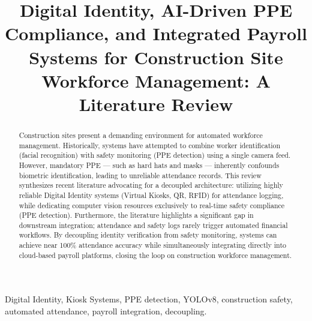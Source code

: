 \documentclass[conference]{IEEEtran}
\begin{document}
\title{Digital Identity, AI-Driven PPE Compliance, and Integrated Payroll Systems for Construction Site Workforce Management: A Literature Review\\}

\author{
\and
{}
}

\maketitle

\begin{abstract}
Construction sites present a demanding environment for automated workforce management. Historically, systems have attempted to combine worker identification (facial recognition) with safety monitoring (PPE detection) using a single camera feed. However, mandatory PPE — such as hard hats and masks — inherently confounds biometric identification, leading to unreliable attendance records. This review synthesizes recent literature advocating for a decoupled architecture: utilizing highly reliable Digital Identity systems (Virtual Kiosks, QR, RFID) for attendance logging, while dedicating computer vision resources exclusively to real-time safety compliance (PPE detection). Furthermore, the literature highlights a significant gap in downstream integration; attendance and safety logs rarely trigger automated financial workflows. By decoupling identity verification from safety monitoring, systems can achieve near 100\% attendance accuracy while simultaneously integrating directly into cloud-based payroll platforms, closing the loop on construction workforce management.
\end{abstract}

\begin{IEEEkeywords}
Digital Identity, Kiosk Systems, PPE detection, YOLOv8, construction safety, automated attendance, payroll integration, decoupling.
\end{IEEEkeywords}
\end{document}

